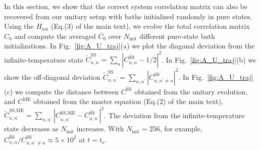\documentclass[reprint, superscriptaddress, aps, prl]{revtex4-2}
\begin{document}
In this section, we show that the correct system correlation matrix can also be recovered from our unitary setup with baths initialized randomly in pure states.
Using the $H_{\text{tot}}$ (Eq.(3) of the main text), we evolve the total correlation matrix $C_0$ and compute the averaged $\overline{C_0}$ over $N_{\text{init}}$ different pure-state bath initializations.
In Fig.~\ref{fig:A_U_traj}(a) we plot the diagonal deviation from the infinite-temperature state $\tilde{C}_{n,n}^{\text{SS}} = \sum_{n} | \overline{C^{\text{SS}}_{n,n}} - 1/2|^2$.
In Fig.~\ref{fig:A_U_traj}(b) we show the off-diagonal deviation $\tilde{C}_{n,n^\prime}^{\text{SS}} = \sum_{n,n^\prime} | \overline{C^{\text{SS}}_{n,n^\prime\neq n}} |^2$.
In Fig.~\ref{fig:A_U_traj}(c) we compute the distance between $\overline{C^{\text{SS}}}$ obtained from the unitary evolution, and $C^{\text{ME}}$ obtained from the master equation (Eq.(2) of the main text), $\tilde{C}^{\text{SS}, \text{ME}}_{n, n^\prime} = \sum_{n,n^\prime} | C^{\text{SS}, \text{ME}}_{n, n^\prime} - \overline{C^{\text{SS}}_{n, n^\prime}}|^2$.
The deviation from the infinite-temperature state decreases as $N_{\text{init}}$ increases.
With $N_{\text{init}} = 256$, for example, $\overline{C^{\text{SS}}_{n, n}}/ \overline{C^{\text{SS}}_{n, n^\prime \neq n}} \approx 5 \times 10^2$ at $t=t_{\text{s}}$.
\end{document}
